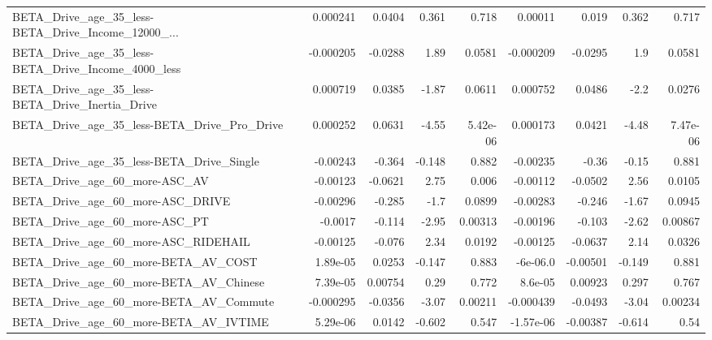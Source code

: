 \begin{tabular}{lrrrrrrrr}
BETA\_Drive\_age\_35\_less-BETA\_Drive\_Income\_12000\_... &    0.000241 &       0.0404 &    0.361 &    0.718 &    0.00011 &       0.019 &        0.362 &         0.717 \\
BETA\_Drive\_age\_35\_less-BETA\_Drive\_Income\_4000\_less &   -0.000205 &      -0.0288 &     1.89 &   0.0581 &  -0.000209 &     -0.0295 &          1.9 &        0.0581 \\
BETA\_Drive\_age\_35\_less-BETA\_Drive\_Inertia\_Drive    &    0.000719 &       0.0385 &    -1.87 &   0.0611 &   0.000752 &      0.0486 &         -2.2 &        0.0276 \\
BETA\_Drive\_age\_35\_less-BETA\_Drive\_Pro\_Drive        &    0.000252 &       0.0631 &    -4.55 & 5.42e-06 &   0.000173 &      0.0421 &        -4.48 &      7.47e-06 \\
BETA\_Drive\_age\_35\_less-BETA\_Drive\_Single           &    -0.00243 &       -0.364 &   -0.148 &    0.882 &   -0.00235 &       -0.36 &        -0.15 &         0.881 \\
BETA\_Drive\_age\_60\_more-ASC\_AV                      &    -0.00123 &      -0.0621 &     2.75 &    0.006 &   -0.00112 &     -0.0502 &         2.56 &        0.0105 \\
BETA\_Drive\_age\_60\_more-ASC\_DRIVE                   &    -0.00296 &       -0.285 &     -1.7 &   0.0899 &   -0.00283 &      -0.246 &        -1.67 &        0.0945 \\
BETA\_Drive\_age\_60\_more-ASC\_PT                      &     -0.0017 &       -0.114 &    -2.95 &  0.00313 &   -0.00196 &      -0.103 &        -2.62 &       0.00867 \\
BETA\_Drive\_age\_60\_more-ASC\_RIDEHAIL                &    -0.00125 &       -0.076 &     2.34 &   0.0192 &   -0.00125 &     -0.0637 &         2.14 &        0.0326 \\
BETA\_Drive\_age\_60\_more-BETA\_AV\_COST                &    1.89e-05 &       0.0253 &   -0.147 &    0.883 &   -6e-06.0 &    -0.00501 &       -0.149 &         0.881 \\
BETA\_Drive\_age\_60\_more-BETA\_AV\_Chinese             &    7.39e-05 &      0.00754 &     0.29 &    0.772 &    8.6e-05 &     0.00923 &        0.297 &         0.767 \\
BETA\_Drive\_age\_60\_more-BETA\_AV\_Commute             &   -0.000295 &      -0.0356 &    -3.07 &  0.00211 &  -0.000439 &     -0.0493 &        -3.04 &       0.00234 \\
BETA\_Drive\_age\_60\_more-BETA\_AV\_IVTIME              &    5.29e-06 &       0.0142 &   -0.602 &    0.547 &  -1.57e-06 &    -0.00387 &       -0.614 &          0.54 \\

\end{tabular}
